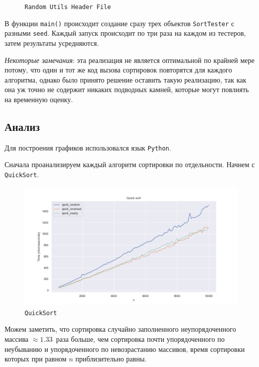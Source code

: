\documentclass[11pt,a4paper]{scrarticle}
\theoremstyle{definition}
\begin{document}
\begin{figure}[htp]
	\centering
	\inputminted[linenos,fontsize=\small]{cpp}{../analyze/random_utils.h}
	\caption{\texttt{Random Utils Header File}}
	\label{code:random-h}
\end{figure}
\FloatBarrier

В функции \texttt{main()} происходит создание сразу трех объектов \texttt{SortTester} с разными \texttt{seed}. Каждый запуск происходит по три раза на каждом из тестеров, затем результаты усредняются.

\emph{Некоторые замечания}: эта реализация не является оптимальной по крайней мере потому, что один и тот же код вызова сортировок повторятся для каждого алгоритма, однако было принято решение оставить такую реализацию, так как она уж точно не содержит никаких подводных камней, которые могут повлиять на временную оценку.

\subsection*{Анализ}

Для построения графиков использовался язык \texttt{Python}.

Сначала проанализируем каждый алгоритм сортировки по отдельности. Начнем с \texttt{QuickSort}.

\begin{figure}[htp]
	\centering
	\includegraphics[width=\textwidth]{../static/quick.png}
	\caption{\texttt{QuickSort}}
	\label{fig:quick}
\end{figure}
\FloatBarrier

Можем заметить, что сортировка случайно заполненного неупорядоченного массива $\approx 1.33$~раза больше, чем сортировка почти упорядоченного по неубыванию и упорядоченного по невозрастанию массивов, время сортировки которых при равном $n$ приблизительно равны.
\end{document}
